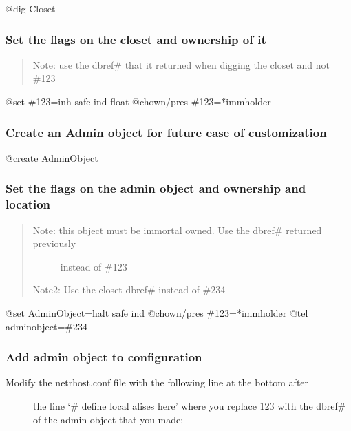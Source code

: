 \documentclass[letterpaper,10pt,english]{sphinxmanual}
\begin{document}
\sphinxAtStartPar
@dig Closet


\subsubsection{Set the flags on the closet and ownership of it}
\label{\detokenize{gettingstarted:set-the-flags-on-the-closet-and-ownership-of-it}}\begin{quote}

\sphinxAtStartPar
Note: use the dbref\# that it returned when digging the closet and not \#123
\end{quote}

\sphinxAtStartPar
@set \#123=inh safe ind float
@chown/pres \#123=*immholder


\subsubsection{Create an Admin object for future ease of customization}
\label{\detokenize{gettingstarted:create-an-admin-object-for-future-ease-of-customization}}
\sphinxAtStartPar
@create AdminObject


\subsubsection{Set the flags on the admin object and ownership and location}
\label{\detokenize{gettingstarted:set-the-flags-on-the-admin-object-and-ownership-and-location}}\begin{quote}
\begin{description}
\item[{Note: this object must be immortal owned.  Use the dbref\# returned previously}] \leavevmode
\sphinxAtStartPar
instead of \#123

\end{description}

\sphinxAtStartPar
Note2: Use the closet dbref\# instead of \#234
\end{quote}

\sphinxAtStartPar
@set AdminObject=halt safe ind
@chown/pres \#123=*immholder
@tel adminobject=\#234


\subsubsection{Add admin object to configuration}
\label{\detokenize{gettingstarted:add-admin-object-to-configuration}}\begin{description}
\item[{Modify the netrhost.conf file with the following line at the bottom after}] \leavevmode
\sphinxAtStartPar
the line ‘\# define local alises here’ where you replace 123 with the
dbref\# of the admin object that you made:

\end{description}
\end{document}
